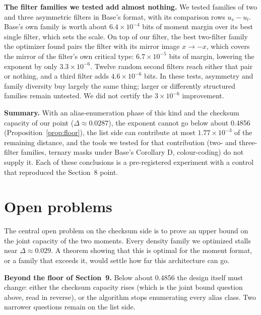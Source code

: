 \documentclass[11pt]{article}
\theoremstyle{plain}
\begin{document}
\textbf{The filter families we tested add almost nothing.} We tested families of two and three asymmetric filters in Base's format, with its comparison rows $u_v - u_l$. Base's own family is worth about $6.4\times10^{-4}$ bits of moment margin over its best single filter, which sets the scale. On top of our filter, the best two-filter family the optimizer found pairs the filter with its mirror image $x \to -x$, which covers the mirror of the filter's own critical type: $6.7\times10^{-5}$ bits of margin, lowering the exponent by only $3.3\times10^{-6}$. Twelve random second filters reach either that pair or nothing, and a third filter adds $4.6\times10^{-6}$ bits. In these tests, asymmetry and family diversity buy largely the same thing; larger or differently structured families remain untested. We did not certify the $3\times10^{-6}$ improvement.

\textbf{Summary.} With an alias-enumeration phase of this kind and the checksum capacity of our point ($\Delta \approx 0.0287$), the exponent cannot go below about 0.4856 (Proposition~\ref{prop:floor}), the list side can contribute at most $1.77\times10^{-3}$ of the remaining distance, and the tools we tested for that contribution (two- and three-filter families, ternary masks under Base's Corollary D, colour-coding) do not supply it. Each of these conclusions is a pre-registered experiment with a control that reproduced the Section~8 point.

\section{Open problems}

The central open problem on the checksum side is to prove an upper bound on the joint capacity of the two moments. Every density family we optimized stalls near $\Delta \approx 0.029$. A theorem showing that this is optimal for the moment format, or a family that exceeds it, would settle how far this architecture can go.

\textbf{Beyond the floor of Section~9.} Below about 0.4856 the design itself must change: either the checksum capacity rises (which is the joint bound question above, read in reverse), or the algorithm stops enumerating every alias class. Two narrower questions remain on the list side.
\end{document}
